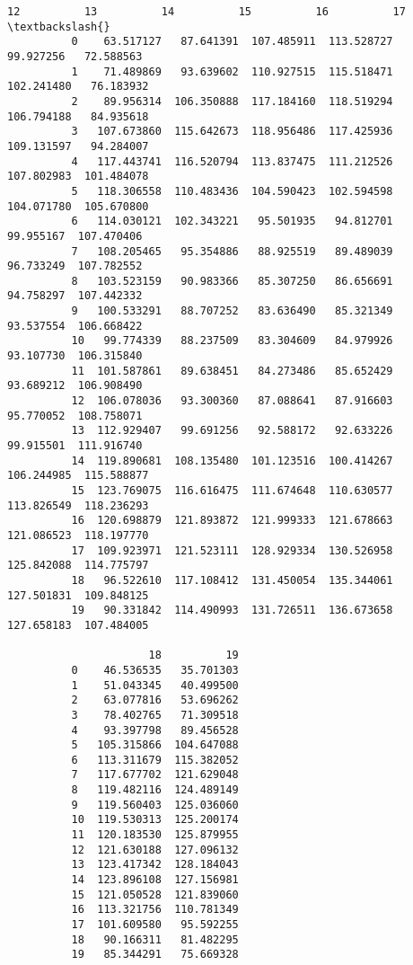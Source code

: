 \documentclass[11pt]{article}
\begin{document}
\begin{Verbatim}[commandchars=\\\{\}]
                      12          13          14          15          16          17  \textbackslash{}
          0    63.517127   87.641391  107.485911  113.528727   99.927256   72.588563   
          1    71.489869   93.639602  110.927515  115.518471  102.241480   76.183932   
          2    89.956314  106.350888  117.184160  118.519294  106.794188   84.935618   
          3   107.673860  115.642673  118.956486  117.425936  109.131597   94.284007   
          4   117.443741  116.520794  113.837475  111.212526  107.802983  101.484078   
          5   118.306558  110.483436  104.590423  102.594598  104.071780  105.670800   
          6   114.030121  102.343221   95.501935   94.812701   99.955167  107.470406   
          7   108.205465   95.354886   88.925519   89.489039   96.733249  107.782552   
          8   103.523159   90.983366   85.307250   86.656691   94.758297  107.442332   
          9   100.533291   88.707252   83.636490   85.321349   93.537554  106.668422   
          10   99.774339   88.237509   83.304609   84.979926   93.107730  106.315840   
          11  101.587861   89.638451   84.273486   85.652429   93.689212  106.908490   
          12  106.078036   93.300360   87.088641   87.916603   95.770052  108.758071   
          13  112.929407   99.691256   92.588172   92.633226   99.915501  111.916740   
          14  119.890681  108.135480  101.123516  100.414267  106.244985  115.588877   
          15  123.769075  116.616475  111.674648  110.630577  113.826549  118.236293   
          16  120.698879  121.893872  121.999333  121.678663  121.086523  118.197770   
          17  109.923971  121.523111  128.929334  130.526958  125.842088  114.775797   
          18   96.522610  117.108412  131.450054  135.344061  127.501831  109.848125   
          19   90.331842  114.490993  131.726511  136.673658  127.658183  107.484005   
          
                      18          19  
          0    46.536535   35.701303  
          1    51.043345   40.499500  
          2    63.077816   53.696262  
          3    78.402765   71.309518  
          4    93.397798   89.456528  
          5   105.315866  104.647088  
          6   113.311679  115.382052  
          7   117.677702  121.629048  
          8   119.482116  124.489149  
          9   119.560403  125.036060  
          10  119.530313  125.200174  
          11  120.183530  125.879955  
          12  121.630188  127.096132  
          13  123.417342  128.184043  
          14  123.896108  127.156981  
          15  121.050528  121.839060  
          16  113.321756  110.781349  
          17  101.609580   95.592255  
          18   90.166311   81.482295  
          19   85.344291   75.669328  
\end{Verbatim}
            
\end{document}
